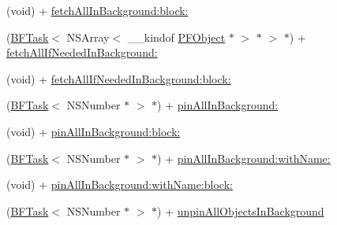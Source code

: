 \begin{DoxyCompactItemize}
\begin{DoxyCompactList}
 \end{DoxyCompactList}\item 
(void) + \hyperlink{interface_p_f_object_a88b8826f7663fdabc81f03796d7ac6c4}{fetch\+All\+In\+Background\+:block\+:}
\item 
(\hyperlink{class_b_f_task}{B\+F\+Task}$<$ N\+S\+Array$<$ \+\_\+\+\_\+kindof \hyperlink{interface_p_f_object}{P\+F\+Object} $\ast$ $>$ $\ast$ $>$ $\ast$) + \hyperlink{interface_p_f_object_a08cbd0d9817f5e9704c2050410a738ad}{fetch\+All\+If\+Needed\+In\+Background\+:}
\item 
(void) + \hyperlink{interface_p_f_object_a9568350cd8d726ad3cbc6b9503059a49}{fetch\+All\+If\+Needed\+In\+Background\+:block\+:}
\item 
(\hyperlink{class_b_f_task}{B\+F\+Task}$<$ N\+S\+Number $\ast$ $>$ $\ast$) + \hyperlink{interface_p_f_object_a7036a736a56c3e02c337596a44794b34}{pin\+All\+In\+Background\+:}
\begin{DoxyCompactList}\small\item\em 

 \end{DoxyCompactList}\item 
(void) + \hyperlink{interface_p_f_object_ac6933e719bb0a50737a5b199d945825c}{pin\+All\+In\+Background\+:block\+:}
\item 
(\hyperlink{class_b_f_task}{B\+F\+Task}$<$ N\+S\+Number $\ast$ $>$ $\ast$) + \hyperlink{interface_p_f_object_a337158d42ed65bf2598edaa327d9bf7b}{pin\+All\+In\+Background\+:with\+Name\+:}
\item 
(void) + \hyperlink{interface_p_f_object_abb555aea325cf8b042eea9710debb5c7}{pin\+All\+In\+Background\+:with\+Name\+:block\+:}
\item 
(\hyperlink{class_b_f_task}{B\+F\+Task}$<$ N\+S\+Number $\ast$ $>$ $\ast$) + \hyperlink{interface_p_f_object_a609fa5865dae73ef442d98629ffd99f0}{unpin\+All\+Objects\+In\+Background}
\begin{DoxyCompactList}\small\item\em 


\end{DoxyCompactList}
\end{DoxyCompactItemize}
